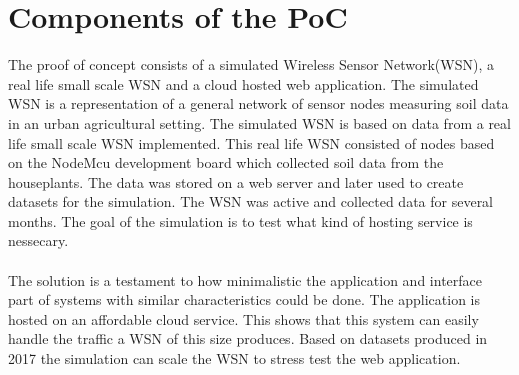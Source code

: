 \documentclass[]{uiophd}
\begin{document}
\section{Components of the PoC}
The proof of concept consists of a simulated Wireless Sensor Network(WSN), a real life small scale WSN and a cloud hosted web application. The simulated WSN is a representation of a general network of sensor nodes measuring soil data in an urban agricultural setting. The simulated WSN is based on data from a real life small scale WSN implemented. This real life WSN consisted of nodes based on the NodeMcu development board which collected soil data from the houseplants. The data was stored on a web server and later used to create datasets for the simulation. The WSN was active and collected data for several months. The goal of the simulation is to test what kind of hosting service is nessecary.
\\\\
The solution is a testament to how minimalistic the application and interface part of systems with similar characteristics could be done. The application is hosted on an affordable cloud service. This shows that this system can easily handle the traffic a WSN of this size produces. Based on datasets produced in 2017 the simulation can scale the WSN to stress test the web application.
\end{document}
